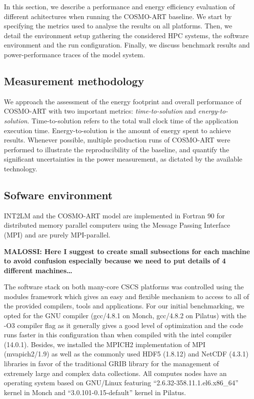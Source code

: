 In  this section,  we  describe a  performance  and energy  efficiency
evaluation  of  different  achitectures  when  running  the  COSMO-ART
baseline.  We  start by  specifying the metrics used to analyse the results on all platforms.
Then, we detail the environment  setup gathering the considered HPC systems,
the  software  environment and  the  run  configuration.  Finally,  we
discuss benchmark  results and  power-performance traces of  the model
system.

\subsection{Measurement methodology}
\label{subsec:4.1}
We  approach  the  assessment  of  the energy  footprint  and  overall
performance    of    COSMO-ART    with    two    important    metrics:
\textit{time-to-solution}       and       \textit{energy-to-solution}.
Time-to-solution  refers   to  the  total  wall  clock   time  of  the
application execution time. Energy-to-solution is the amount of energy
spent  to achieve  results.  Whenever possible, multiple production
runs of COSMO-ART were  performed to illustrate the reproducibility of
the baseline, and quantify  the significant uncertainties in the power
measurement, as dictated by the available technology.


\subsection{Sofware environment}
\label{subsec:4.2}
INT2LM  and the  COSMO-ART model  are  implemented in  Fortran 90  for
distributed  memory  parallel  computers  using  the  Message  Passing
Interface (MPI)  and are purely  MPI-parallel.

\textbf{MALOSSI: Here I suggest to create small subsections for each machine to avoid confusion especially because we need to put details of 4 different machines\ldots}

The software  stack on
both  many-core  CSCS  platforms  was  controlled  using  the  modules
framework which gives an easy  and flexible mechanism to access to all
of the  provided compilers, tools  and applications.  For  our initial
benchmarking,  we opted  for  the GNU  compiler  (gcc/4.8.1 on  Monch,
gcc/4.8.2 on Pilatus) with the -O3 compiler flag as it generally gives
a  good  level  of optimization  and  the  code  runs faster  in  this
configuration  than when  compiled with  the intel  compiler (14.0.1).
Besides, we installed the  MPICH2 implementation of MPI (mvapich2/1.9)
as  well  as  the  commonly  used HDF5  (1.8.12)  and  NetCDF  (4.3.1)
libraries in favor of the  traditional GRIB library for the management
of extremely  large and complex data collections.   All computes nodes
have    an   operating   system    based   on    GNU/Linux   featuring
``2.6.32-358.11.1.el6.x86\_64''      kernel      in     Monch      and
``3.0.101-0.15-default'' kernel in Pilatus.

